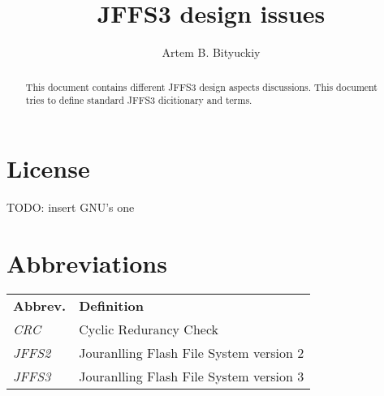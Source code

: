 \documentclass[12pt,a4paper,twoside,titlepage]{article}
\begin{document}
%
%
\title{JFFS3 design issues}
\author{Artem B. Bityuckiy}
\maketitle

%
%
\thispagestyle{empty}
\begin{abstract}
This document contains different JFFS3 design aspects discussions.
This document tries to define standard JFFS3 dicitionary and terms.
\end{abstract}

%
%
\thispagestyle{empty}
\section*{License}
TODO: insert GNU's one

%
%
\section*{Abbreviations}
\begin{tabular}{ll}

\large \textbf{Abbrev.}
&
\large \textbf{Definition}
\\[7pt]

\emph{CRC}
&
Cyclic Redurancy Check
\\[4pt]

\emph{JFFS2}
&
Jouranlling Flash File System version 2
\\[4pt]

\emph{JFFS3}
&
Jouranlling Flash File System version 3
\\[4pt]

\end{tabular}

%
%
\end{document}
